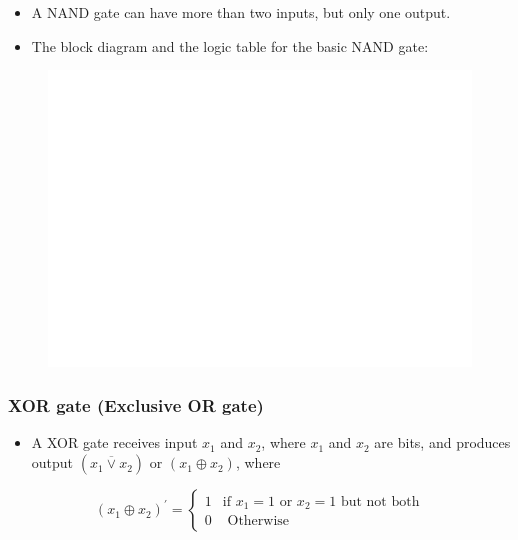 \documentclass[]{book}
\providecommand{\tightlist}{%
  \setlength{\itemsep}{0pt}\setlength{\parskip}{0pt}}
\begin{document}
\begin{itemize}
\tightlist
\item
  A NAND gate can have more than two inputs, but only one output.
\item
  The block diagram and the logic table for the basic NAND gate:
\end{itemize}

\begin{figure}

{\centering \includegraphics[width=1\linewidth]{figure/boxC45-1} 

}

\end{figure}

\hypertarget{xor-gate-exclusive-or-gate}{%
\subsubsection{XOR gate (Exclusive OR gate)}\label{xor-gate-exclusive-or-gate}}

\begin{itemize}
\tightlist
\item
  A XOR gate receives input \(x_1\) and \(x_2\), where \(x_1\) and \(x_2\) are bits, and produces output \((x_1 \overline{\lor} x_2)\) or \((x_1 \oplus x_2)\), where
\end{itemize}

\begin{equation}
(x_1 \oplus x_2)^\prime =
\begin{cases} 
1 & \text{if } x_1 =1 \text{ or } x_2=1 \text{ but not both}\\
0 & \text{ Otherwise }
\end{cases}
\end{equation}
\end{document}
